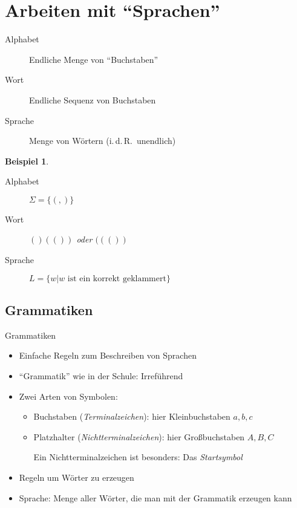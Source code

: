 \documentclass{beamer}
\theoremstyle{example}
\newtheorem{ex}{Beispiel}
\renewenvironment{example}{\begin{ex}}{\end{ex}}
\begin{document}
\section{Arbeiten mit ``Sprachen''}
\begin{frame}
  \begin{definition}
    \begin{description}
    \item[Alphabet] Endliche Menge von ``Buchstaben''
    \item[Wort] Endliche Sequenz von Buchstaben
    \item[Sprache] Menge von Wörtern (i.\,d.\,R.\ unendlich)
    \end{description}
  \end{definition}
  \begin{example}
    \begin{description}
    \item[Alphabet] $\Sigma = \{ (,)\}$
    \item[Wort] $()(())$ oder $((())$
    \item[Sprache] $L=\{w | \text{$w$ ist ein korrekt geklammert}\}$
    \end{description}
  \end{example}
\end{frame}

\subsection{Grammatiken}
\begin{frame}{Grammatiken}
  \begin{itemize}
  \item Einfache Regeln zum Beschreiben von Sprachen
  \item ``Grammatik'' wie in der Schule: Irreführend
  \item Zwei Arten von Symbolen:
    \begin{itemize}
    \item Buchstaben (\emph{Terminalzeichen}): hier Kleinbuchstaben $a,b,c$
    \item Platzhalter (\emph{Nichtterminalzeichen}): hier Großbuchstaben $A,B,C$

      Ein Nichtterminalzeichen ist besonders: Das \emph{Startsymbol}
    \end{itemize}
  \item Regeln um Wörter zu erzeugen
  \item Sprache: Menge aller Wörter, die man mit der Grammatik erzeugen kann
  \end{itemize}
\end{frame}
\end{document}
